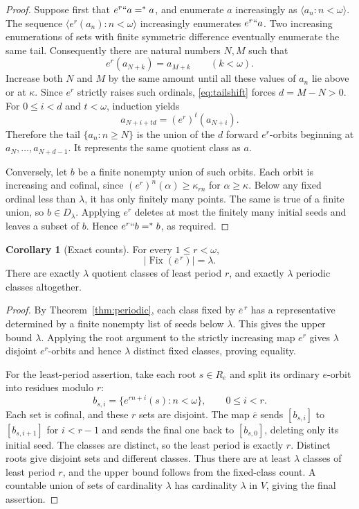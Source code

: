 \documentclass[11pt,letterpaper]{article}
\theoremstyle{definition}
\newtheorem{corollary}[definition]{Corollary}
\numberwithin{equation}{section}
\newcommand{\Fix}{\operatorname{Fix}}
\newcommand{\eqfin}{\mathrel{=^{*}}}
\newcommand{\ov}[1]{\overline{#1}}
\begin{document}
\begin{proof}
Suppose first that $e^r``a\eqfin a$, and enumerate $a$ increasingly as $\langle a_n:n<\omega\rangle$. The sequence $\langle e^r(a_n):n<\omega\rangle$ increasingly enumerates $e^r``a$. Two increasing enumerations of sets with finite symmetric difference eventually enumerate the same tail. Consequently there are natural numbers $N,M$ such that
\begin{equation}\label{eq:tailshift}
             e^r(a_{N+k})=a_{M+k}\qquad(k<\omega).
\end{equation}
Increase both $N$ and $M$ by the same amount until all these values of $a_n$ lie above or at $\kappa$. Since $e^r$ strictly raises such ordinals, \eqref{eq:tailshift} forces $d=M-N>0$. For $0\le i<d$ and $t<\omega$, induction yields
\[
                   a_{N+i+td}=(e^r)^t(a_{N+i}).
\]
Therefore the tail $\{a_n:n\ge N\}$ is the union of the $d$ forward $e^r$-orbits beginning at $a_N,\ldots,a_{N+d-1}$. It represents the same quotient class as $a$.

Conversely, let $b$ be a finite nonempty union of such orbits. Each orbit is increasing and cofinal, since $(e^r)^n(\alpha)\ge\kappa_{rn}$ for $\alpha\ge\kappa$. Below any fixed ordinal less than $\lambda$, it has only finitely many points. The same is true of a finite union, so $b\in D_\lambda$. Applying $e^r$ deletes at most the finitely many initial seeds and leaves a subset of $b$. Hence $e^r``b\eqfin b$, as required.
\end{proof}

\begin{corollary}[Exact counts]\label{cor:periodcounts}
For every $1\le r<\omega$,
\[
                  |\Fix(\ov e^{\,r})|=\lambda.
\]
There are exactly $\lambda$ quotient classes of least period $r$, and exactly $\lambda$ periodic classes altogether.
\end{corollary}

\begin{proof}
By Theorem~\ref{thm:periodic}, each class fixed by $\ov e^{\,r}$ has a representative determined by a finite nonempty list of seeds below $\lambda$. This gives the upper bound $\lambda$. Applying the root argument to the strictly increasing map $e^r$ gives $\lambda$ disjoint $e^r$-orbits and hence $\lambda$ distinct fixed classes, proving equality.

For the least-period assertion, take each root $s\in R_e$ and split its ordinary $e$-orbit into residues modulo $r$:
\[
          b_{s,i}=\{e^{rn+i}(s):n<\omega\},\qquad 0\le i<r.
\]
Each set is cofinal, and these $r$ sets are disjoint. The map $\ov e$ sends $[b_{s,i}]$ to $[b_{s,i+1}]$ for $i<r-1$ and sends the final one back to $[b_{s,0}]$, deleting only its initial seed. The classes are distinct, so the least period is exactly $r$. Distinct roots give disjoint sets and different classes. Thus there are at least $\lambda$ classes of least period $r$, and the upper bound follows from the fixed-class count. A countable union of sets of cardinality $\lambda$ has cardinality $\lambda$ in $V$, giving the final assertion.
\end{proof}
\end{document}
